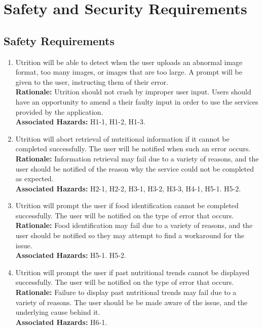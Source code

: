 \documentclass{article}
\begin{document}
\section{Safety and Security Requirements}
\subsection{Safety Requirements}
\begin{enumerate}[{SR}1.]
	\item Utrition will be able to detect when the user uploads an abnormal 
	image format, too many images, or images that are too large. A prompt will 
	be given to the user, instructing them of their error. \\
	\textbf{Rationale:}  Utrition should not crash by improper user 
	input. Users should have an opportunity to amend a their faulty input in 
	order to use the services provided by the application.\\	
	\textbf{Associated Hazards:} H1-1, H1-2, H1-3.
	
	\item Utrition will abort retrieval of nutritional information if it cannot 
	be completed successfully. The user will be notified when such 
	an error occurs. \\
	\textbf{Rationale:}  Information retrieval may fail due to a variety of 
	reasons, and the user should be notified of the reason why the service 
	could not be completed as expected.\\	
	\textbf{Associated Hazards:} H2-1, H2-2, H3-1, H3-2, H3-3, H4-1, H5-1. H5-2.
	
	\item Utrition will prompt the user if food identification cannot 
	be completed successfully. The user will be notified on the type of error 
	that occurs. \\
	\textbf{Rationale:}  Food identification may fail due to a variety of 
	reasons, and the user should be notified so they may attempt to find a  
	workaround for the issue. \\	
	\textbf{Associated Hazards:} H5-1. H5-2.
	
	\item Utrition will prompt the user if past nutritional trends cannot
	be displayed successfully. The user will be notified on the type of error 
	that occurs. \\
	\textbf{Rationale:}  Failure to display past nutritional trends may fail 
	due to a variety of reasons. The user should be be made aware of the issue, 
	and the underlying cause behind it.\\	
	\textbf{Associated Hazards:} H6-1.
\end{enumerate}
\end{document}

